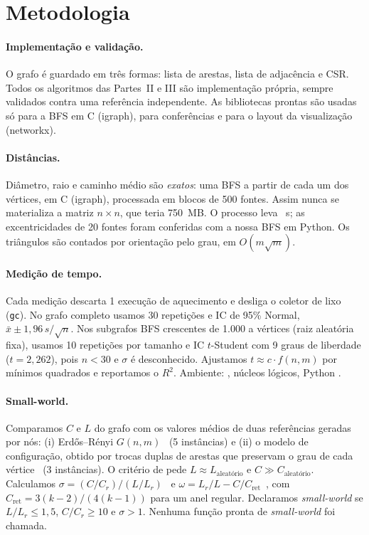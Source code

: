 \IfFileExists{webmedia.cls}{\documentclass[sigconf]{webmedia}}{\documentclass[sigconf]{acmart}}
\begin{document}


\section{Metodologia}\label{sec:metodo}
\paragraph{Implementação e validação.} O grafo é guardado em três formas: lista de arestas, lista de adjacência e CSR. Todos os algoritmos das Partes~II e III são implementação própria, sempre validados contra uma referência independente. As bibliotecas prontas são usadas só para a BFS em C (igraph), para conferências e para o layout da visualização (networkx).

\paragraph{Distâncias.} Diâmetro, raio e caminho médio são \emph{exatos}: uma BFS a partir de cada um dos \nV{} vértices, em C (igraph), processada em blocos de 500 fontes. Assim nunca se materializa a matriz $n \times n$, que teria 750~MB. O processo leva \segDistancias~s; as excentricidades de 20 fontes foram conferidas com a nossa BFS em Python. Os triângulos são contados por orientação pelo grau, em $O(m\sqrt{m})$.

\paragraph{Medição de tempo.} Cada medição descarta 1 execução de aquecimento e desliga o coletor de lixo (\texttt{gc}). No grafo completo usamos 30 repetições e IC de 95\% Normal, $\bar{x} \pm 1{,}96\, s/\sqrt{n}$. Nos subgrafos BFS crescentes de 1.000 a \nV{} vértices (raiz aleatória fixa), usamos 10 repetições por tamanho e IC $t$-Student com 9 graus de liberdade ($t = 2{,}262$), pois $n < 30$ e $\sigma$ é desconhecido. Ajustamos $t \approx c \cdot f(n,m)$ por mínimos quadrados e reportamos o $R^2$. Ambiente: \cpu, \nucleos{} núcleos lógicos, Python \pyver.

\paragraph{Small-world.} Comparamos $C$ e $L$ do grafo com os valores médios de duas referências geradas por nós: (i) Erdős–Rényi $G(n,m)$~\cite{erdos1959} (5 instâncias) e (ii) o modelo de configuração, obtido por \swTrocas{} trocas duplas de arestas que preservam o grau de cada vértice~\cite{maslov2002} (3 instâncias). O critério de \citet{watts1998} pede $L \approx L_{\text{aleatório}}$ e $C \gg C_{\text{aleatório}}$. Calculamos $\sigma = (C/C_r)/(L/L_r)$~\cite{humphries2008} e $\omega = L_r/L - C/C_{\text{ret}}$~\cite{telesford2011}, com $C_{\text{ret}} = 3(k-2)/(4(k-1))$ para um anel regular. Declaramos \emph{small-world} se $L/L_r \leq 1{,}5$, $C/C_r \geq 10$ e $\sigma > 1$. Nenhuma função pronta de \emph{small-world} foi chamada.
\end{document}
